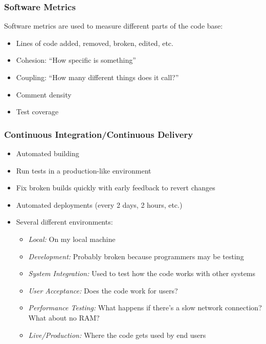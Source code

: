 \subsubsection{Software Metrics}\label{ssub:software_metrics}

Software metrics are used to measure different parts of the code base:

\begin{itemize}
    \item Lines of code added, removed, broken, edited, etc.
    \item Cohesion: ``How specific is something''
    \item Coupling: ``How many different things does it call?''
    \item Comment density
    \item Test coverage
\end{itemize}

\subsubsection{Continuous Integration/Continuous Delivery}\label{ssub:continuous_integration_continuous_delivery}

\begin{itemize}
    \item Automated building
    \item Run tests in a production-like environment
    \item Fix broken builds quickly with early feedback to revert changes
    \item Automated deployments (every 2 days, 2 hours, etc.)
    \item Several different environments:
        \begin{itemize}
            \item \emph{Local:} On my local machine
            \item \emph{Development:} Probably broken because programmers may be testing
            \item \emph{System Integration:} Used to test how the code works with other systems
            \item \emph{User Acceptance:} Does the code work for users?
            \item \emph{Performance Testing:} What happens if there's a slow network connection? What about no RAM?
            \item \emph{Live/Production:} Where the code gets used by end users
        \end{itemize}
\end{itemize}

